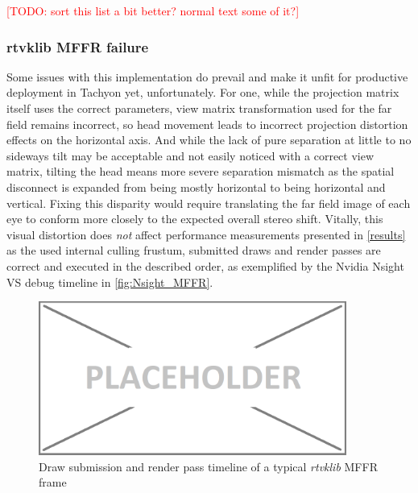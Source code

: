 \textcolor{red}{[TODO: sort this list a bit better? normal text some of it?] \\}

\subsubsection{rtvklib MFFR failure}
Some issues with this implementation do prevail and make it unfit for productive deployment in Tachyon yet, unfortunately. 
For one, while the projection matrix itself uses the correct parameters, view matrix transformation used for the far field remains incorrect, so head movement leads to incorrect projection distortion effects on the horizontal axis. And while the lack of pure separation at little to no sideways tilt may be acceptable and not easily noticed with a correct view matrix, tilting the head means more severe separation mismatch as the spatial disconnect is expanded from being mostly horizontal to being horizontal and vertical. Fixing this disparity would require translating the far field image of each eye to conform more closely to the expected overall stereo shift. 
Vitally, this visual distortion does \textit{not} affect performance measurements presented in \autoref{results} as the used internal culling frustum, submitted draws and render passes are correct and executed in the described order, as exemplified by the Nvidia Nsight VS debug timeline in \autoref{fig:Nsight_MFFR}. \\

\begin{figure}[htb]
  \centering
  \includegraphics[width=0.9\textwidth]{pictures/placeholder}
  \caption{Draw submission and render pass timeline of a typical \textit{rtvklib} MFFR frame} \label{fig:Nsight_MFFR}
\end{figure}


